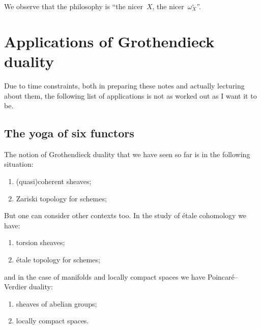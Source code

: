 We observe that the philosophy is ``the nicer~$X$, the nicer~$\omega_X^\circ$''.


\section{Applications of Grothendieck duality}
\label{section:applications-grothendieck-duality}
Due to time constraints, both in preparing these notes and actually lecturing about them, the following list of applications is not as worked out as I want it to be.

\subsection{The yoga of six functors}
\label{subsection:six-functors-yoga}
The notion of Grothendieck duality that we have seen so far is in the following situation:
\begin{enumerate}
  \item (quasi)coherent sheaves;
  \item Zariski topology for schemes;
\end{enumerate}
But one can consider other contexts too. In the study of \'etale cohomology we have:
\begin{enumerate}
  \item torsion sheaves;
  \item \'etale topology for schemes;
\end{enumerate}
and in the case of manifolds and locally compact spaces we have Poincar\'e--Verdier duality:
\begin{enumerate}
  \item sheaves of abelian groups;
  \item locally compact spaces.
\end{enumerate}

